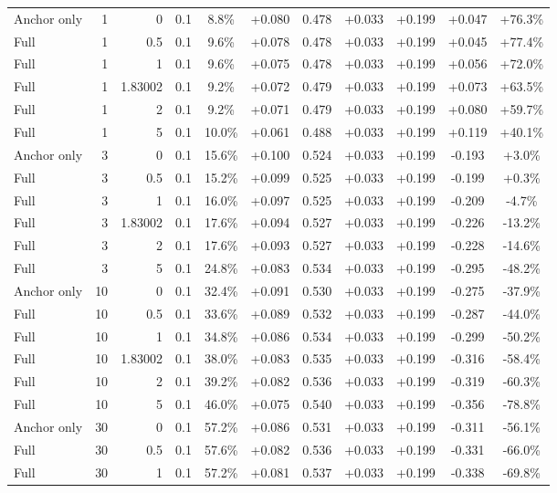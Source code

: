 \begin{table}[htbp]
\begin{tabular}{lrrrccccccc}
Anchor only & 1 & 0 & 0.1 & 8.8\% & +0.080 & 0.478 & +0.033 & +0.199 & +0.047 & +76.3\% \\
Full & 1 & 0.5 & 0.1 & 9.6\% & +0.078 & 0.478 & +0.033 & +0.199 & +0.045 & +77.4\% \\
Full & 1 & 1 & 0.1 & 9.6\% & +0.075 & 0.478 & +0.033 & +0.199 & +0.056 & +72.0\% \\
Full & 1 & 1.83002 & 0.1 & 9.2\% & +0.072 & 0.479 & +0.033 & +0.199 & +0.073 & +63.5\% \\
Full & 1 & 2 & 0.1 & 9.2\% & +0.071 & 0.479 & +0.033 & +0.199 & +0.080 & +59.7\% \\
Full & 1 & 5 & 0.1 & 10.0\% & +0.061 & 0.488 & +0.033 & +0.199 & +0.119 & +40.1\% \\
Anchor only & 3 & 0 & 0.1 & 15.6\% & +0.100 & 0.524 & +0.033 & +0.199 & -0.193 & +3.0\% \\
Full & 3 & 0.5 & 0.1 & 15.2\% & +0.099 & 0.525 & +0.033 & +0.199 & -0.199 & +0.3\% \\
Full & 3 & 1 & 0.1 & 16.0\% & +0.097 & 0.525 & +0.033 & +0.199 & -0.209 & -4.7\% \\
Full & 3 & 1.83002 & 0.1 & 17.6\% & +0.094 & 0.527 & +0.033 & +0.199 & -0.226 & -13.2\% \\
Full & 3 & 2 & 0.1 & 17.6\% & +0.093 & 0.527 & +0.033 & +0.199 & -0.228 & -14.6\% \\
Full & 3 & 5 & 0.1 & 24.8\% & +0.083 & 0.534 & +0.033 & +0.199 & -0.295 & -48.2\% \\
Anchor only & 10 & 0 & 0.1 & 32.4\% & +0.091 & 0.530 & +0.033 & +0.199 & -0.275 & -37.9\% \\
Full & 10 & 0.5 & 0.1 & 33.6\% & +0.089 & 0.532 & +0.033 & +0.199 & -0.287 & -44.0\% \\
Full & 10 & 1 & 0.1 & 34.8\% & +0.086 & 0.534 & +0.033 & +0.199 & -0.299 & -50.2\% \\
Full & 10 & 1.83002 & 0.1 & 38.0\% & +0.083 & 0.535 & +0.033 & +0.199 & -0.316 & -58.4\% \\
Full & 10 & 2 & 0.1 & 39.2\% & +0.082 & 0.536 & +0.033 & +0.199 & -0.319 & -60.3\% \\
Full & 10 & 5 & 0.1 & 46.0\% & +0.075 & 0.540 & +0.033 & +0.199 & -0.356 & -78.8\% \\
Anchor only & 30 & 0 & 0.1 & 57.2\% & +0.086 & 0.531 & +0.033 & +0.199 & -0.311 & -56.1\% \\
Full & 30 & 0.5 & 0.1 & 57.6\% & +0.082 & 0.536 & +0.033 & +0.199 & -0.331 & -66.0\% \\
Full & 30 & 1 & 0.1 & 57.2\% & +0.081 & 0.537 & +0.033 & +0.199 & -0.338 & -69.8\% \\

\end{tabular}
\end{table}
